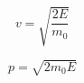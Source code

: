 \documentclass[../main.tex]{subfiles}%
\begin{document}
%
    \Xequation%
    \begin{equation*}%
         v = \sqrt{\dfrac{2 E}{m_{0}}}%
    \end{equation*}%
    \par%
    \vspace*{-2.50ex}%
    \begin{equation}%
         p = \sqrt{2 m_{0} E}%
        \label{eq:momentum-energy}%
    \end{equation}%
\end{document}
